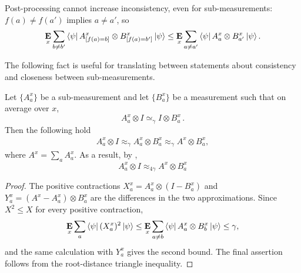\documentclass[11pt]{article}
\theoremstyle{definition}
\newcommand{\E}{\mathop{\bf E\/}}
\newcommand{\ot}{\otimes}
\begin{document}
Post-processing cannot increase inconsistency, even for
sub-measurements: $f(a)\ne f(a')$ implies $a\ne a'$, so
\[
 \E_x\sum_{b\ne b'}\bra\psi
 A^x_{[f(a)=b]}\otimes B^x_{[f(a)=b']}\ket\psi
 \leq\E_x\sum_{a\ne a'}\bra\psi A_a^x\otimes B_{a'}^x\ket\psi.
\]

The following fact is useful for translating between statements about consistency and closeness between sub-measurements.
\begin{proposition}
\label{prop:cons-sub-meas}
Let $\{A^x_a\}$ be a sub-measurement and let $\{B^x_a\}$ be a measurement such that on average over $x$,
\[
	A^x_a \ot I \simeq_\gamma I \ot B^x_a \,.
\]
Then the following hold
	\begin{gather}
		A^x_a \ot I \approx_{\gamma} A^x_a \ot B^x_a \approx_{\gamma} A^x \ot B^x_a,
		\label{eq:closeness5}
	\end{gather}
	where $A^x = \sum_a A^x_a$.
	As a result, by ,
	\begin{equation*}
	A^x_a \ot I \approx_{4\gamma} A^x \ot B^x_a
	\end{equation*}
\end{proposition}
\begin{proof}
The positive contractions
$X_a^x=A_a^x\otimes(I-B_a^x)$ and
$Y_a^x=(A^x-A_a^x)\otimes B_a^x$ are the differences in the two
approximations.  Since $X^2\leq X$ for every positive contraction,
\[
 \E_x\sum_a\bra\psi(X_a^x)^2\ket\psi
 \leq\E_x\sum_{a\ne b}\bra\psi A_a^x\otimes B_b^x\ket\psi\leq\gamma,
\]
and the same calculation with $Y_a^x$ gives the second bound.
The final assertion follows from the root-distance triangle inequality.
\end{proof}
\end{document}
